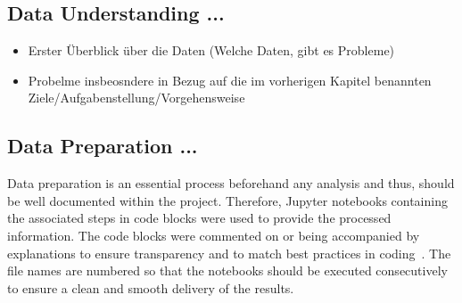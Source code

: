 \subsection{Data Understanding ...}\label{subsec:dataunderstanding}
\begin{itemize}
    \item Erster Überblick über die Daten (Welche Daten, gibt es Probleme)
    \item Probelme insbeosndere in Bezug auf die im vorherigen Kapitel benannten Ziele/Aufgabenstellung/Vorgehensweise
\end{itemize}

\subsection{Data Preparation ...}\label{subsec:datapreparation}
Data preparation is an essential process beforehand any analysis and thus, should be well documented within the project.
Therefore, Jupyter notebooks containing the associated steps in code blocks were used to provide the processed information.
The code blocks were commented on or being accompanied by explanations to ensure transparency and to match best practices in coding~\autocite[cf.][]{Kosourova.2021}.
The file names are numbered so that the notebooks should be executed consecutively to ensure a clean and smooth delivery of the results.

